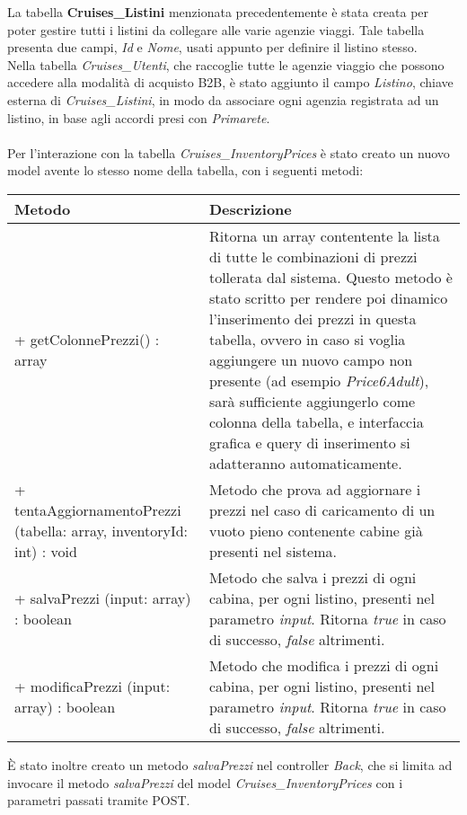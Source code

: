 La tabella \textbf{Cruises\_Listini} menzionata precedentemente è stata creata per poter gestire tutti i listini da collegare alle varie agenzie viaggi. Tale tabella presenta due campi, \textit{Id} e \textit{Nome}, usati appunto per definire il listino stesso. \\
Nella tabella \textit{Cruises\_Utenti}, che raccoglie tutte le agenzie viaggio che possono accedere alla modalità di acquisto B2B, è stato aggiunto il campo \textit{Listino}, chiave esterna di \textit{Cruises\_Listini}, in modo da associare ogni agenzia registrata ad un listino, in base agli accordi presi con \textit{Primarete}. \\ \\
Per l'interazione con la tabella \textit{Cruises\_InventoryPrices} è stato creato un nuovo model avente lo stesso nome della tabella, con i seguenti metodi: 
\begin{center}
	\def\arraystretch{1.5}
	\begin{longtable}{ >{\raggedright}p{5.5cm} p{6.8cm}} 
		\hline
		\textbf{Metodo} & \textbf{Descrizione} \\ \hline
		+ getColonnePrezzi() : array & Ritorna un array contentente la lista di tutte le combinazioni di prezzi tollerata dal sistema. Questo metodo è stato scritto per rendere poi dinamico l'inserimento dei prezzi in questa tabella, ovvero in caso si voglia aggiungere un nuovo campo non presente (ad esempio \textit{Price6Adult}), sarà sufficiente aggiungerlo come colonna della tabella, e interfaccia grafica e query di inserimento si adatteranno automaticamente. \\
		\hline
		+ tentaAggiornamentoPrezzi (tabella: array, inventoryId: int) : void & Metodo che prova ad aggiornare i prezzi nel caso di caricamento di un vuoto pieno contenente cabine già presenti nel sistema.\\
		\hline
		+ salvaPrezzi (input: array) : boolean & Metodo che salva i prezzi di ogni cabina, per ogni listino, presenti nel parametro \textit{input}. Ritorna \textit{true} in caso di successo, \textit{false} altrimenti.\\
		\hline
		+ modificaPrezzi (input: array) : boolean & Metodo che modifica i prezzi di ogni cabina, per ogni listino, presenti nel parametro \textit{input}. Ritorna \textit{true} in caso di successo, \textit{false} altrimenti.\\
		\hline
	\end{longtable}
\end{center}
È stato inoltre creato un metodo \textit{salvaPrezzi} nel controller \textit{Back}, che si limita ad invocare il metodo \textit{salvaPrezzi} del model \textit{Cruises\_InventoryPrices} con i parametri passati tramite POST.\\
